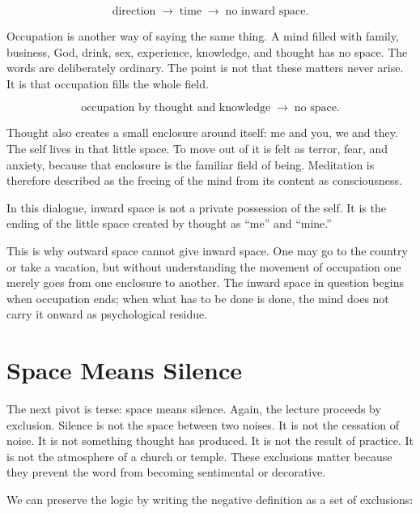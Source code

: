 \begin{equation}
\text{direction}
\;\longrightarrow\;
\text{time}
\;\longrightarrow\;
\text{no inward space}.
\end{equation}

Occupation is another way of saying the same thing. A mind filled with family, business, God, drink, sex, experience, knowledge, and thought has no space. The words are deliberately ordinary. The point is not that these matters never arise. It is that occupation fills the whole field.

\begin{equation}
\text{occupation by thought and knowledge}
\;\longrightarrow\;
\text{no space}.
\end{equation}

Thought also creates a small enclosure around itself: me and you, we and they. The self lives in that little space. To move out of it is felt as terror, fear, and anxiety, because that enclosure is the familiar field of being. Meditation is therefore described as the freeing of the mind from its content as consciousness.

\begin{definition}
In this dialogue, inward space is not a private possession of the self. It is the ending of the little space created by thought as ``me'' and ``mine.''
\end{definition}

This is why outward space cannot give inward space. One may go to the country or take a vacation, but without understanding the movement of occupation one merely goes from one enclosure to another. The inward space in question begins when occupation ends; when what has to be done is done, the mind does not carry it onward as psychological residue.

\section{Space Means Silence}

The next pivot is terse: space means silence. Again, the lecture proceeds by exclusion. Silence is not the space between two noises. It is not the cessation of noise. It is not something thought has produced. It is not the result of practice. It is not the atmosphere of a church or temple. These exclusions matter because they prevent the word from becoming sentimental or decorative.

We can preserve the logic by writing the negative definition as a set of exclusions:

